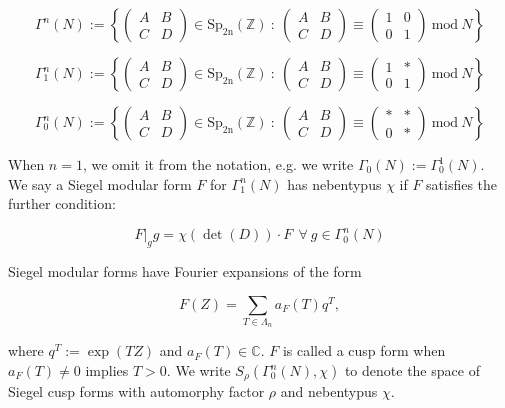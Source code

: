 \documentclass[11pt]{article}
\theoremstyle{definition}
\theoremstyle{remark}
\newcommand{\C}{\mathbb{C}}
\newcommand{\Z}{\mathbb{Z}}
\begin{document}
\[
\Gamma^n(N) := \left\{ \begin{pmatrix} A & B \\ C & D \end{pmatrix} \in \mathrm{Sp_{2n}(\Z)} \ : \ \begin{pmatrix} A & B \\ C & D \end{pmatrix} \equiv \begin{pmatrix} 1 & 0 \\ 0 & 1 \end{pmatrix} \ \mathrm{mod} \ N \right\}
\]

\[
\Gamma_1^n(N) := \left\{ \begin{pmatrix} A & B \\ C & D \end{pmatrix} \in \mathrm{Sp_{2n}(\Z)} \ : \ \begin{pmatrix} A & B \\ C & D \end{pmatrix} \equiv \begin{pmatrix} 1 & \ast \\ 0 & 1 \end{pmatrix} \ \mathrm{mod} \ N \right\}
\]

\[
\Gamma_0^n(N) := \left\{ \begin{pmatrix} A & B \\ C & D \end{pmatrix} \in \mathrm{Sp_{2n}(\Z)} \ : \ \begin{pmatrix} A & B \\ C & D \end{pmatrix} \equiv \begin{pmatrix} \ast & \ast \\ 0 & \ast \end{pmatrix} \ \mathrm{mod} \ N \right\}
\]

When $n = 1$, we omit it from the notation, e.g. we write $\Gamma_0(N) := \Gamma_0^1(N)$. \\

We say a Siegel modular form $F$ for $\Gamma_1^n(N)$ has nebentypus $\chi$ if $F$ satisfies the further condition:

\[
F \vert_g g = \chi(\det(D)) \cdot F \ \ \forall \ g \in \Gamma_0^n(N)
\]

Siegel modular forms have Fourier expansions of the form 

\[
F(Z) = \sum_{T \in \Lambda_n} a_F(T) q^T,
\]

where $q^T := \exp(TZ)$ and $a_F(T) \in \C$. $F$ is called a cusp form when $a_F(T) \neq 0$ implies $T > 0$. We write $S_\rho(\Gamma_0^n(N), \chi)$ to denote the space of Siegel cusp forms with automorphy factor $\rho$ and nebentypus $\chi$. \\
\end{document}
